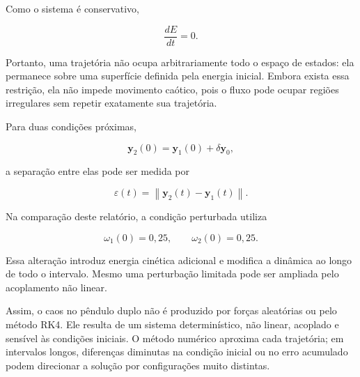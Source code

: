\documentclass[12pt,a4paper]{article}
\begin{document}
Como o sistema é conservativo,

\begin{equation}
\frac{dE}{dt}=0.
\end{equation}

Portanto, uma trajetória não ocupa arbitrariamente todo o espaço de estados: ela permanece sobre uma superfície definida pela energia inicial. Embora exista essa restrição, ela não impede movimento caótico, pois o fluxo pode ocupar regiões irregulares sem repetir exatamente sua trajetória.

Para duas condições próximas,

\begin{equation}
\mathbf{y}_2(0)=\mathbf{y}_1(0)+\delta\mathbf{y}_0,
\end{equation}

a separação entre elas pode ser medida por

\begin{equation}
\varepsilon(t)=\left\|\mathbf{y}_2(t)-\mathbf{y}_1(t)\right\|.
\end{equation}

Na comparação deste relatório, a condição perturbada utiliza

\begin{equation}
\omega_1(0)=0{,}25,
\qquad
\omega_2(0)=0{,}25.
\end{equation}

Essa alteração introduz energia cinética adicional e modifica a dinâmica ao longo de todo o intervalo. Mesmo uma perturbação limitada pode ser ampliada pelo acoplamento não linear.

Assim, o caos no pêndulo duplo não é produzido por forças aleatórias ou pelo método RK4. Ele resulta de um sistema determinístico, não linear, acoplado e sensível às condições iniciais. O método numérico aproxima cada trajetória; em intervalos longos, diferenças diminutas na condição inicial ou no erro acumulado podem direcionar a solução por configurações muito distintas.
\end{document}
